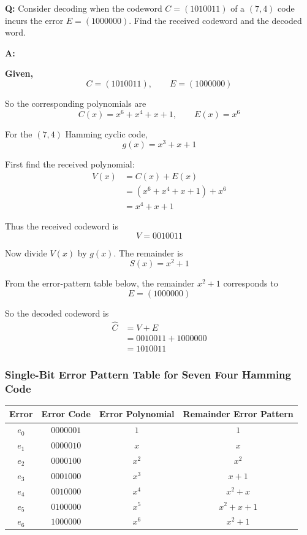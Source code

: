 \documentclass[11pt,a4paper]{book}
\renewcommand{\arraystretch}{1.4}
\newenvironment{formulabox}[1][Formula]{%
    \begin{tcolorbox}[
        enhanced,
        breakable,
        colback=softcoral!10,
        colframe=softcoral!200,
        title=#1,
        fonttitle=\bfseries,
        coltitle=white,
        sharp corners,
        boxrule=1pt,
        left=8pt,
        right=8pt,
        top=6pt,
        bottom=6pt
    ]
}{\end{tcolorbox}}
\newcounter{qna}[chapter]
\renewcommand{\theqna}{\thechapter.\arabic{qna}}
\newenvironment{questionanswerbox}[1][Example]{%
    \refstepcounter{qna}
    \begin{tcolorbox}[
        enhanced,
        breakable,
        colback=softlavender!10,
        colframe=softlavender!200,
        title={#1~\theqna},
        fonttitle=\bfseries,
        coltitle=white,
        colbacktitle=softlavender!200,
        sharp corners,
        boxrule=1pt,
        left=8pt,
        right=8pt,
        top=6pt,
        bottom=6pt
    ]
}{\end{tcolorbox}}
\begin{document}
\begin{questionanswerbox}[Cyclic Decoding Example]
\textbf{Q:} Consider decoding when the codeword \(C=(1010011)\) of a \((7,4)\) code incurs the error \(E=(1000000)\). Find the received codeword and the decoded word.

\textbf{A:}

\textbf{Given,}
\[
C=(1010011),\qquad E=(1000000)
\]

So the corresponding polynomials are
\[
C(x)=x^6+x^4+x+1,\qquad E(x)=x^6
\]

For the \((7,4)\) Hamming cyclic code,
\[
g(x)=x^3+x+1
\]

First find the received polynomial:
\begin{align*}
V(x)&=C(x)+E(x)\\
    &=(x^6+x^4+x+1)+x^6\\
    &=x^4+x+1
\end{align*}

Thus the received codeword is
\[
V=0010011
\]

Now divide \(V(x)\) by \(g(x)\). The remainder is
\[
S(x)=x^2+1
\]

From the error-pattern table below, the remainder \(x^2+1\) corresponds to
\[
E=(1000000)
\]

So the decoded codeword is
\begin{align*}
\hat C &= V+E\\
       &= 0010011+1000000\\
       &= 1010011
\end{align*}
\end{questionanswerbox}

\subsubsection{Single-Bit Error Pattern Table for Seven Four Hamming Code}

\begin{formulabox}[Single-Bit Error Pattern Table for 7 4 Hamming Code]
\begin{center}
\renewcommand{\arraystretch}{1.2}
\setlength{\tabcolsep}{8pt}
\begin{tabular}{|c|c|c|c|}
\hline
\textbf{Error} & \textbf{Error Code} & \textbf{Error Polynomial} & \textbf{Remainder Error Pattern} \\
\hline
\(e_0\) & \(0000001\) & \(1\) & \(1\) \\
\hline
\(e_1\) & \(0000010\) & \(x\) & \(x\) \\
\hline
\(e_2\) & \(0000100\) & \(x^2\) & \(x^2\) \\
\hline
\(e_3\) & \(0001000\) & \(x^3\) & \(x+1\) \\
\hline
\(e_4\) & \(0010000\) & \(x^4\) & \(x^2+x\) \\
\hline
\(e_5\) & \(0100000\) & \(x^5\) & \(x^2+x+1\) \\
\hline
\(e_6\) & \(1000000\) & \(x^6\) & \(x^2+1\) \\
\hline
\end{tabular}
\end{center}
\end{formulabox}
\end{document}
